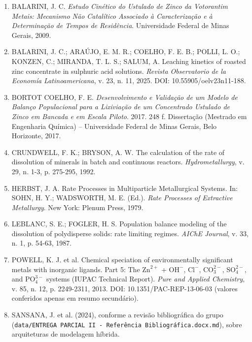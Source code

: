\documentclass[12pt,a4paper]{article}
\begin{document}
\begin{enumerate}
    \item BALARINI, J. C. \textit{Estudo Cinético do Ustulado de Zinco da Votorantim Metais: Mecanismo Não Catalítico Associado à Caracterização e à Determinação de Tempos de Residência}. Universidade Federal de Minas Gerais, 2009.
    \item BALARINI, J. C.; ARAÚJO, E. M. R.; COELHO, F. E. B.; POLLI, L. O.; KONZEN, C.; MIRANDA, T. L. S.; SALUM, A. Leaching kinetics of roasted zinc concentrate in sulphuric acid solutions. \textit{Revista Observatorio de la Economía Latinoamericana}, v. 23, n. 11, 2025. DOI: 10.55905/oelv23n11-188.
    \item BORTOT COELHO, F. E. \textit{Desenvolvimento e Validação de um Modelo de Balanço Populacional para a Lixiviação de um Concentrado Ustulado de Zinco em Bancada e em Escala Piloto}. 2017. 248 f. Dissertação (Mestrado em Engenharia Química) -- Universidade Federal de Minas Gerais, Belo Horizonte, 2017.
    \item CRUNDWELL, F. K.; BRYSON, A. W. The calculation of the rate of dissolution of minerals in batch and continuous reactors. \textit{Hydrometallurgy}, v. 29, n. 1-3, p. 275-295, 1992.
    \item HERBST, J. A. Rate Processes in Multiparticle Metallurgical Systems. In: SOHN, H. Y.; WADSWORTH, M. E. (Ed.). \textit{Rate Processes of Extractive Metallurgy}. New York: Plenum Press, 1979.
    \item LEBLANC, S. E.; FOGLER, H. S. Population balance modeling of the dissolution of polydisperse solids: rate limiting regimes. \textit{AIChE Journal}, v. 33, n. 1, p. 54-63, 1987.
    \item POWELL, K. J. et al. Chemical speciation of environmentally significant metals with inorganic ligands. Part 5: The $\text{Zn}^{2+}$ + $\text{OH}^-$, $\text{Cl}^-$, $\text{CO}_3^{2-}$, $\text{SO}_4^{2-}$, and $\text{PO}_4^{3-}$ systems (IUPAC Technical Report). \textit{Pure and Applied Chemistry}, v. 85, n. 12, p. 2249-2311, 2013. DOI: 10.1351/PAC-REP-13-06-03 (valores conferidos apenas em resumo secundário).
    \item SANSANA, J. et al. (2024), conforme a revisão bibliográfica do grupo (\texttt{data/ENTREGA PARCIAL II - Referência Bibliográfica.docx.md}), sobre arquiteturas de modelagem híbrida.
\end{enumerate}
\end{document}
